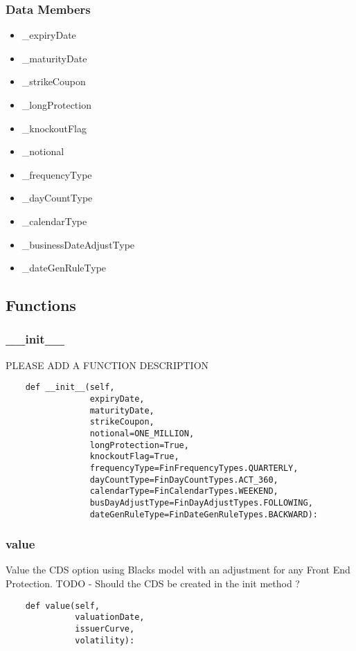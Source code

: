 \documentclass[twoside,11pt]{book}
\begin{document}
\subsubsection*{Data Members}
\begin{itemize}
\item{\_expiryDate}
\item{\_maturityDate}
\item{\_strikeCoupon}
\item{\_longProtection}
\item{\_knockoutFlag}
\item{\_notional}
\item{\_frequencyType}
\item{\_dayCountType}
\item{\_calendarType}
\item{\_businessDateAdjustType}
\item{\_dateGenRuleType}
\end{itemize}

\subsection*{Functions}

\subsubsection*{{\bf \_\_init\_\_}}
PLEASE ADD A FUNCTION DESCRIPTION

\begin{lstlisting}
    def __init__(self,
                 expiryDate,
                 maturityDate,
                 strikeCoupon,
                 notional=ONE_MILLION,
                 longProtection=True,
                 knockoutFlag=True,
                 frequencyType=FinFrequencyTypes.QUARTERLY,
                 dayCountType=FinDayCountTypes.ACT_360,
                 calendarType=FinCalendarTypes.WEEKEND,
                 busDayAdjustType=FinDayAdjustTypes.FOLLOWING,
                 dateGenRuleType=FinDateGenRuleTypes.BACKWARD):
\end{lstlisting}

\subsubsection*{{\bf value}}
Value the CDS option using Blacks model with an adjustment for any Front End Protection. TODO - Should the CDS be created in the init method ?  

\begin{lstlisting}
    def value(self,
              valuationDate,
              issuerCurve,
              volatility):
\end{lstlisting}
\end{document}
